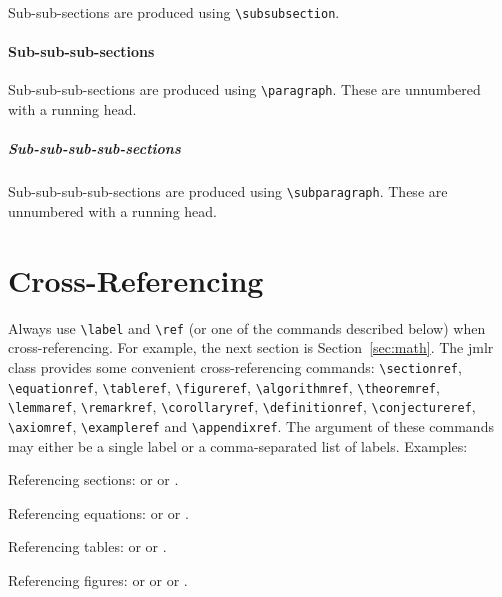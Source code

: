 \documentclass[mlabstract]{jmlr}
\begin{document}
Sub-sub-sections are produced using \verb|\subsubsection|.

\paragraph{Sub-sub-sub-sections}

Sub-sub-sub-sections are produced using \verb|\paragraph|.
These are unnumbered with a running head.

\subparagraph{Sub-sub-sub-sub-sections}

Sub-sub-sub-sub-sections are produced using \verb|\subparagraph|.
These are unnumbered with a running head.

\section{Cross-Referencing}

Always use \verb|\label| and \verb|\ref| (or one of the commands
described below) when cross-referencing.  For example, the next
section is Section~\ref{sec:math}. The \textsf{jmlr} class
provides some convenient cross-referencing commands:
\verb|\sectionref|, \verb|\equationref|, \verb|\tableref|,
\verb|\figureref|, \verb|\algorithmref|, \verb|\theoremref|,
\verb|\lemmaref|, \verb|\remarkref|, \verb|\corollaryref|,
\verb|\definitionref|, \verb|\conjectureref|, \verb|\axiomref|,
\verb|\exampleref| and \verb|\appendixref|. The argument of these
commands may either be a single label or a comma-separated list
of labels. Examples:

Referencing sections:  or
 or
.

Referencing equations:  or
 or
.

Referencing tables:  or
 or
.

Referencing figures:  or
 or
 or
.
\end{document}
